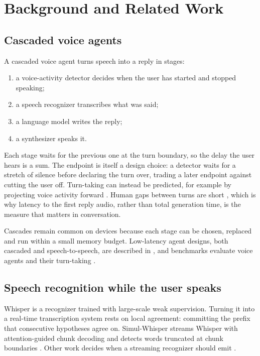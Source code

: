 \chapter{Background and Related Work}
\label{ch:background}

\section{Cascaded voice agents}
\label{sec:cascade}

A cascaded voice agent turns speech into a reply in stages:
\begin{enumerate}
\item a voice-activity detector decides when the user has started and stopped
  speaking;
\item a speech recognizer transcribes what was said;
\item a language model writes the reply;
\item a synthesizer speaks it.
\end{enumerate}
Each stage waits for the previous one at the turn boundary, so the delay the
user hears is a sum. The endpoint is itself a design choice: a detector waits
for a stretch of silence before declaring the turn over, trading a later
endpoint against cutting the user off. Turn-taking can instead be predicted,
for example by projecting voice activity forward \cite{vap2022}. Human gaps
between turns are short \cite{stivers2009universals}, which is why latency to
the first reply audio, rather than total generation time, is the measure
that matters in conversation.

Cascades remain common on devices because each stage can be chosen, replaced
and run within a small memory budget. Low-latency agent designs, both cascaded
and speech-to-speech, are described in
\cite{ilava2025,chipchat2025,kame2026,streamrag2025,moshirag2026}, and
benchmarks evaluate voice agents and their turn-taking
\cite{fullduplexbench2025,fullduplexbenchv3_2026,voicebench2026,voiceagentbench2025,evabench2026,provoicebench2026,sid2026}.

\section{Speech recognition while the user speaks}
\label{sec:streaming-asr}

Whisper \cite{radford2023whisper} is a recognizer trained with large-scale
weak supervision. Turning it into a real-time transcription system
\cite{machacek2023whisperstreaming} rests on local agreement: committing the
prefix that consecutive hypotheses agree on. Simul-Whisper streams Whisper with
attention-guided chunk decoding and detects words truncated at chunk
boundaries \cite{wang2024simulwhisper}. Other work decides when a streaming
recognizer should emit \cite{x2streaming2026}.

